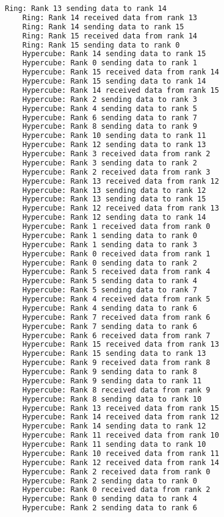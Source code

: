 \documentclass[11pt]{article}
\begin{document}
\begin{lstlisting}[language=bash,caption=Baobab Output]
    Ring: Rank 13 sending data to rank 14
    Ring: Rank 14 received data from rank 13
    Ring: Rank 14 sending data to rank 15
    Ring: Rank 15 received data from rank 14
    Ring: Rank 15 sending data to rank 0
    Hypercube: Rank 14 sending data to rank 15
    Hypercube: Rank 0 sending data to rank 1
    Hypercube: Rank 15 received data from rank 14
    Hypercube: Rank 15 sending data to rank 14
    Hypercube: Rank 14 received data from rank 15
    Hypercube: Rank 2 sending data to rank 3
    Hypercube: Rank 4 sending data to rank 5
    Hypercube: Rank 6 sending data to rank 7
    Hypercube: Rank 8 sending data to rank 9
    Hypercube: Rank 10 sending data to rank 11
    Hypercube: Rank 12 sending data to rank 13
    Hypercube: Rank 3 received data from rank 2
    Hypercube: Rank 3 sending data to rank 2
    Hypercube: Rank 2 received data from rank 3
    Hypercube: Rank 13 received data from rank 12
    Hypercube: Rank 13 sending data to rank 12
    Hypercube: Rank 13 sending data to rank 15
    Hypercube: Rank 12 received data from rank 13
    Hypercube: Rank 12 sending data to rank 14
    Hypercube: Rank 1 received data from rank 0
    Hypercube: Rank 1 sending data to rank 0
    Hypercube: Rank 1 sending data to rank 3
    Hypercube: Rank 0 received data from rank 1
    Hypercube: Rank 0 sending data to rank 2
    Hypercube: Rank 5 received data from rank 4
    Hypercube: Rank 5 sending data to rank 4
    Hypercube: Rank 5 sending data to rank 7
    Hypercube: Rank 4 received data from rank 5
    Hypercube: Rank 4 sending data to rank 6
    Hypercube: Rank 7 received data from rank 6
    Hypercube: Rank 7 sending data to rank 6
    Hypercube: Rank 6 received data from rank 7
    Hypercube: Rank 15 received data from rank 13
    Hypercube: Rank 15 sending data to rank 13
    Hypercube: Rank 9 received data from rank 8
    Hypercube: Rank 9 sending data to rank 8
    Hypercube: Rank 9 sending data to rank 11
    Hypercube: Rank 8 received data from rank 9
    Hypercube: Rank 8 sending data to rank 10
    Hypercube: Rank 13 received data from rank 15
    Hypercube: Rank 14 received data from rank 12
    Hypercube: Rank 14 sending data to rank 12
    Hypercube: Rank 11 received data from rank 10
    Hypercube: Rank 11 sending data to rank 10
    Hypercube: Rank 10 received data from rank 11
    Hypercube: Rank 12 received data from rank 14
    Hypercube: Rank 2 received data from rank 0
    Hypercube: Rank 2 sending data to rank 0
    Hypercube: Rank 0 received data from rank 2
    Hypercube: Rank 0 sending data to rank 4
    Hypercube: Rank 2 sending data to rank 6

\end{lstlisting}
\end{document}
